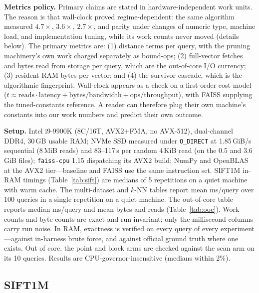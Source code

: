 \documentclass[sigconf, nonacm]{acmart}
\begin{document}
\textbf{Metrics policy.} Primary claims are stated in
hardware-independent work units. The reason is that wall-clock proved
regime-dependent: the same algorithm measured $4.7\times$, $3.6\times$,
$2.7\times$, and parity under changes of numeric type, machine load, and
implementation tuning, while its work counts never moved (details below).
The primary metrics are: (1) distance terms per query, with the pruning
machinery's own work charged separately as bound-ops; (2) full-vector
fetches and bytes read from storage per query, which are the out-of-core
I/O currency; (3) resident RAM bytes per vector; and (4) the survivor
cascade, which is the algorithmic fingerprint. Wall-clock appears as a
check on a first-order cost model
($t \approx \mathrm{reads} \cdot \mathrm{latency} +
\mathrm{bytes}/\mathrm{bandwidth} + \mathrm{ops}/\mathrm{throughput}$),
with FAISS supplying the tuned-constants reference. A reader can therefore plug their own
machine's constants into our work numbers and predict their own outcome.

\textbf{Setup.} Intel i9-9900K (8C/16T, AVX2${+}$FMA, no AVX-512),
dual-channel DDR4, 30\,GB usable RAM; NVMe SSD measured under
\texttt{O\_DIRECT} at 1.85\,GiB/s sequential (8\,MiB reads) and
83--117\,\textmu s per random 4\,KiB read (on the 0.5 and 3.6\,GiB
files); \texttt{faiss-cpu} 1.15 dispatching its AVX2 build;
NumPy and OpenBLAS at the AVX2 tier---baseline and FAISS use the same
instruction set. SIFT1M in-RAM timings (Table~\ref{tab:sift}) are medians
of 5 repetitions on a quiet machine with warm cache. The multi-dataset
and $k$-NN tables report mean ms/query over 100 queries in a single
repetition on a quiet machine. The out-of-core table reports median
ms/query and mean bytes and reads (Table~\ref{tab:ooc}). Work counts and
byte counts are exact and run-invariant; only the millisecond columns
carry run noise. In RAM, exactness is verified on every query of every
experiment---against in-harness brute force, and against official ground
truth where one exists. Out of core, the point and block arms are checked
against the scan arm on its 10 queries. Results are
CPU-governor-insensitive (medians within 2\%).

\subsection{SIFT1M}
\label{sec:sift}
\end{document}
